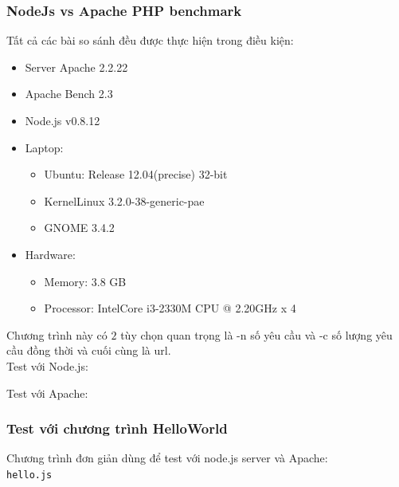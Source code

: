 \subsubsection{NodeJs vs Apache PHP benchmark}

Tất cả các bài so sánh đều được thực hiện trong điều kiện:
\begin{framed}
	\begin{itemize}
		\item Server Apache 2.2.22
		\item Apache Bench 2.3
		\item Node.js v0.8.12
		\item Laptop: 
		
		\begin{itemize}
			\item Ubuntu: Release 12.04(precise) 32-bit
			\item KernelLinux 3.2.0-38-generic-pae
			\item GNOME 3.4.2
		\end{itemize}		

		\item Hardware:
		\begin{itemize}
			\item Memory: 3.8 GB
			\item Processor: IntelCore i3-2330M CPU @ 2.20GHz x 4
		\end{itemize}
	\end{itemize}
\end{framed}
	
	Chương trình này có $2$ tùy chọn quan trọng là -n số yêu cầu và -c số lượng yêu cầu đồng thời và cuối cùng là url.\\
Test với Node.js: \\
	\begin{center}
	\end{center}

Test với Apache:
	\begin{center}
	\end{center}


\subsubsection*{Test với chương trình HelloWorld}
Chương trình đơn giản dùng để test với node.js server và Apache:\\
\texttt{hello.js}
	\begin{framed}
		\inputminted[tabsize=4,linenos=true]{javascript}{hello.js}
	\end{framed}

